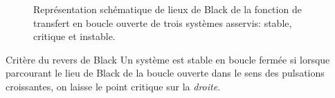 \begin{figure}[!h]
    \centering
    
    \caption{Représentation schématique de lieux de Black de la 
             fonction de transfert en boucle ouverte de trois systèmes 
             asservis: stable, critique et instable.
             \label{fig-black_revers}}
\end{figure}
\begin{criteria}{Critère du revers de Black}
    Un système est stable en boucle fermée si lorsque parcourant 
    le lieu de Black de la boucle ouverte dans le sens des 
    pulsations croissantes, on laisse le point critique sur 
    la \emph{droite}.
\end{criteria}
